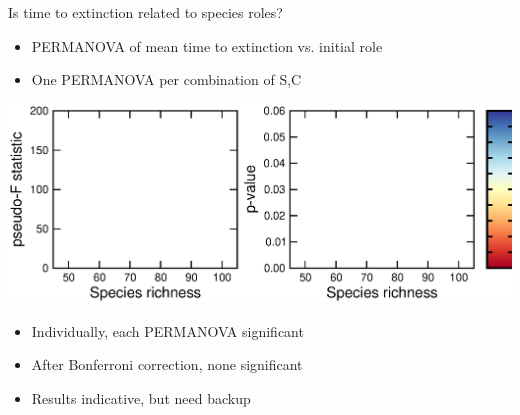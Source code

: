 \documentclass{beamer}
\newcommand*\whitem{%
  \item[\color{white}\scalebox{0.9}{\textbullet}]}
\begin{document}
  \begin{frame}{Is time to extinction related to species roles?}
    \begin{itemize}
      \item PERMANOVA of mean time to extinction vs. initial role
      \item One PERMANOVA per combination of S,C
    \end{itemize}

    \begin{centering}
      \includegraphics[width=\textwidth]{../manuscript/figures/extinction_order/permanova_summary_talk_axis.eps}
    \end{centering}

    \begin{itemize}
      \whitem {\color{white}Individually, each PERMANOVA significant}
      \whitem {\color{white}After Bonferroni correction, none significant}
      \whitem {\color{white}Results indicative, but need backup}
    \end{itemize}
    
    \end{frame}
\end{document}
